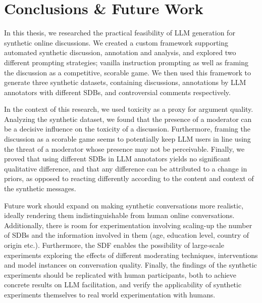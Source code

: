 %
\chapter{Conclusions \& Future Work}
\label{sec:conclusions}

In this thesis, we researched the practical feasibility of LLM generation for synthetic online discussions. We created a custom framework supporting automated synthetic discussion, annotation and analysis, and explored two different prompting strategies; vanilla instruction prompting as well as framing the discussion as a competitive, scorable game. We then used this framework to generate three synthetic datasets, containing discussions, annotations by LLM annotators with different \acp{SDB}, and controversial comments respectively. 

In the context of this research, we used toxicity as a proxy for argument quality. Analyzing the synthetic dataset, we found that the presence of a moderator can be a decisive influence on the toxicity of a discussion. Furthermore, framing the discussion as a scorable game seems to potentially keep LLM users in line using the threat of a moderator whose presence may not be perceivable. Finally, we proved that using different \acp{SDB} in LLM annotators yields no significant qualitative difference, and that any difference can be attributed to a change in priors, as opposed to reacting differently according to the content and context of the synthetic messages.

Future work should expand on making synthetic conversations more realistic, ideally rendering them indistinguishable from human online conversations. Additionally, there is room for experimentation involving scaling-up the number of \acp{SDB} and the information involved in them (age, education level, country of origin etc.). Furthermore, the \ac{SDF} enables the possibility of large-scale experiments exploring the effects of different moderating techniques, interventions and model instances on conversation quality. Finally, the findings of the synthetic experiments should be replicated with human participants, both to achieve concrete results on LLM facilitation, and verify the applicability of synthetic experiments themselves to real world experimentation with humans.
